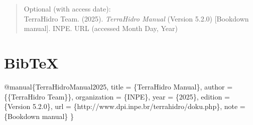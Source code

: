 \documentclass[
]{book}
\newenvironment{Shaded}{\begin{snugshade}}{\end{snugshade}}
\newcommand{\DataTypeTok}[1]{\textcolor[rgb]{0.13,0.29,0.53}{#1}}
\newcommand{\NormalTok}[1]{#1}
\newcommand{\OtherTok}[1]{\textcolor[rgb]{0.56,0.35,0.01}{#1}}
\newcommand{\VariableTok}[1]{\textcolor[rgb]{0.00,0.00,0.00}{#1}}
\begin{document}
\begin{quote}
Optional (with access date):\\
TerraHidro Team. (2025). \emph{TerraHidro Manual} (Version 5.2.0) {[}Bookdown manual{]}. INPE. URL (accessed Month Day, Year)
\end{quote}

\section*{BibTeX}\label{bibtex}

\begin{Shaded}
\begin{Highlighting}[]
\VariableTok{@manual}\NormalTok{\{}\OtherTok{TerraHidroManual2025}\NormalTok{,}
  \DataTypeTok{title}\NormalTok{        = \{TerraHidro Manual\},}
  \DataTypeTok{author}\NormalTok{       = \{\{TerraHidro Team\}\},}
  \DataTypeTok{organization}\NormalTok{ = \{INPE\},}
  \DataTypeTok{year}\NormalTok{         = \{2025\},}
  \DataTypeTok{edition}\NormalTok{      = \{Version 5.2.0\},}
  \DataTypeTok{url}\NormalTok{          = \{http://www.dpi.inpe.br/terrahidro/doku.php\},}
  \DataTypeTok{note}\NormalTok{         = \{Bookdown manual\}}
\NormalTok{\}}
\end{Highlighting}
\end{Shaded}


  
\end{document}
